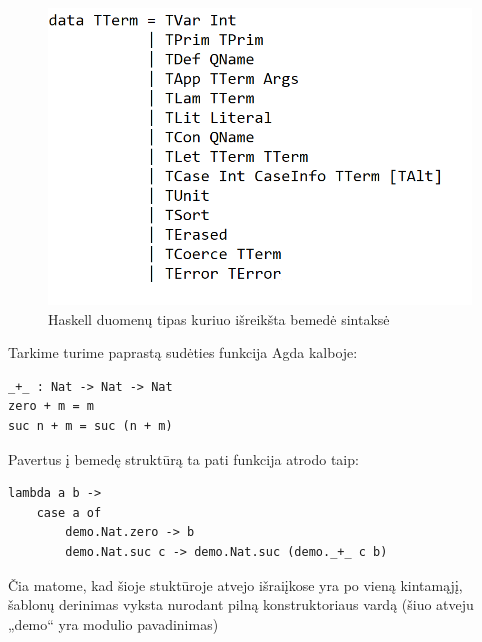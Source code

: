 \documentclass{VUMIFPSbakalaurinis}
\begin{document}
\begin{itemize}
		\begin{figure}[H]
			\centering
			\includegraphics[scale=0.75]{TreelessTerm.png}
			\caption{Haskell duomenų tipas kuriuo išreikšta bemedė sintaksė}
			\label{img:tterm}
			\centering
			\end{figure}
\end{itemize}
Tarkime turime paprastą sudėties funkcija Agda kalboje:
\begin{lstlisting}
_+_ : Nat -> Nat -> Nat
zero + m = m
suc n + m = suc (n + m)
\end{lstlisting}
Pavertus į bemedę struktūrą ta pati funkcija atrodo taip:
\begin{lstlisting}
lambda a b ->
	case a of
		demo.Nat.zero -> b
		demo.Nat.suc c -> demo.Nat.suc (demo._+_ c b)
\end{lstlisting}
Čia matome, kad šioje stuktūroje atvejo išraiįkose yra po vieną kintamąjį, šablonų derinimas vyksta nurodant pilną konstruktoriaus vardą (šiuo atveju „demo“ yra modulio pavadinimas)
\end{document}

